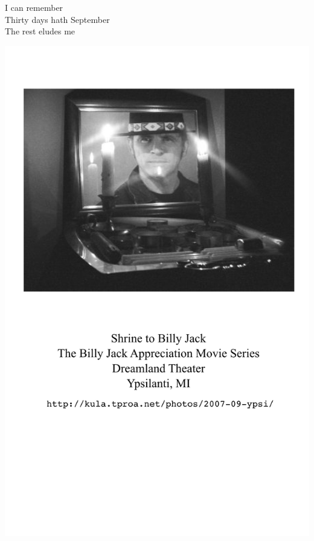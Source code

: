 \documentclass[12pt]{article}
\begin{document}
I can remember \\
Thirty days hath September \\
The rest eludes me

\newpage

\includegraphics{back.png}

\newpage
\end{document}
